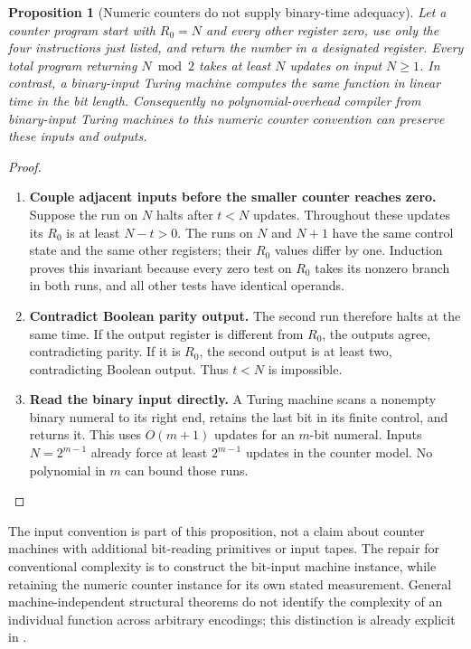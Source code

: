 \documentclass[11pt,a4paper]{article}
\numberwithin{algorithm}{section}
\numberwithin{equation}{section}
\newtheorem{proposition}[proposition]{Proposition}
\theoremstyle{definition}
\theoremstyle{remark}
\theoremstyle{plain}
\theoremstyle{definition}
\theoremstyle{plain}
\begin{document}
\begin{proposition}[Numeric counters do not supply binary-time adequacy]
\label{prop:wc-counter}
Let a counter program start with $R_0=N$ and every other register zero,
use only the four instructions just listed, and return the number in a
designated register. Every total program returning $N\bmod 2$ takes at
least $N$ updates on input $N\geq1$. In contrast, a binary-input Turing
machine computes the same function in linear time in the bit length.
Consequently no polynomial-overhead compiler from binary-input Turing
machines to this numeric counter convention can preserve these inputs
and outputs.
\end{proposition}
\begin{proof}\leavevmode
\begin{enumerate}[leftmargin=*,align=left]
\item \textbf{Couple adjacent inputs before the smaller counter reaches zero.}
Suppose the run on $N$ halts after $t<N$ updates. Throughout these
updates its $R_0$ is at least $N-t>0$. The runs on $N$ and $N+1$ have
the same control state and the same other registers; their $R_0$ values
differ by one. Induction proves this invariant because every zero test
on $R_0$ takes its nonzero branch in both runs, and all other tests have
identical operands.
\item \textbf{Contradict Boolean parity output.}
The second run therefore halts at the same time. If the output register
is different from $R_0$, the outputs agree, contradicting parity. If it
is $R_0$, the second output is at least two, contradicting Boolean
output. Thus $t<N$ is impossible.
\item \textbf{Read the binary input directly.}
A Turing machine scans a nonempty binary numeral to its right end,
retains the last bit in its finite control, and returns it. This uses
$O(m+1)$ updates for an $m$-bit numeral. Inputs $N=2^{m-1}$ already
force at least $2^{m-1}$ updates in the counter model. No polynomial in
$m$ can bound those runs.
\end{enumerate}
\end{proof}

The input convention is part of this proposition, not a claim about
counter machines with additional bit-reading primitives or input tapes.
The repair for conventional complexity is to construct the bit-input
machine instance, while retaining the numeric counter instance for its
own stated measurement. General machine-independent structural theorems
do not identify the complexity of an individual function across arbitrary
encodings; this distinction is already explicit in \citet{Blum1967MachineIndependentComplexity}.
\end{document}

